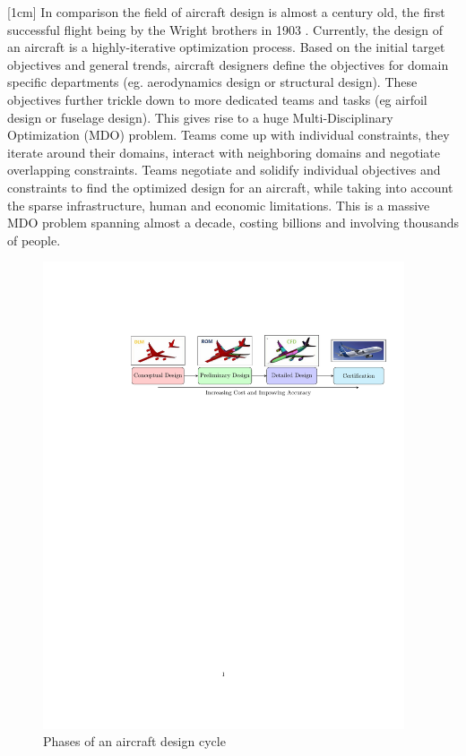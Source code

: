 [1cm]
In comparison the field of aircraft design is almost a century old, the first successful flight being by the Wright brothers in 1903 \cite{wright1934we}. Currently, the design of an aircraft is a highly-iterative optimization process. Based on the initial target objectives and general trends, aircraft designers define the objectives for domain specific departments (eg. aerodynamics design or structural design). These objectives further trickle down to more dedicated teams and tasks (eg airfoil design or fuselage design). This gives rise to a huge Multi-Disciplinary Optimization (MDO) problem. Teams come up with individual constraints, they iterate around their domains, interact with neighboring domains and negotiate overlapping constraints. Teams negotiate and solidify individual objectives and constraints to find the optimized design for an aircraft, while taking into account the sparse infrastructure, human and economic limitations. This is a massive MDO problem spanning almost a decade, costing billions and involving thousands of people. 

\begin{figure}[!ht]
\label{figPhasesOfAircraftDesign}
  \centering
  
    \includegraphics[clip, trim=4.5cm 19cm 0.5cm 4cm,width=0.95\textwidth]
    {images/part1/aircraftDesignCycleFlowChart}
  
  \caption{Phases of an aircraft design cycle}
\end{figure}

